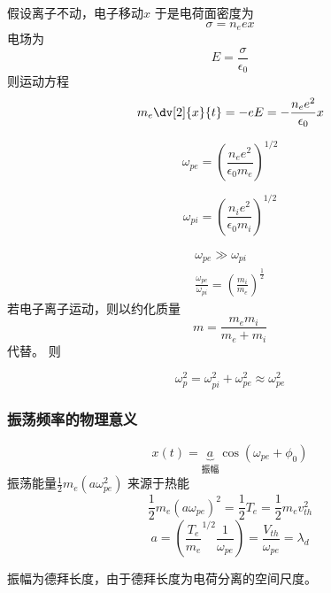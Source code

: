 假设离子不动，电子移动\(x\)
于是电荷面密度为
\begin{equation}
\sigma = n_e e x
\end{equation}
电场为
\begin{equation}
  E = \frac{\sigma}{\epsilon_0}
\end{equation}
则运动方程
\begin{equation}
  m_e \dv[2]{x}{t} = - e E = - \frac{n_e e^2}{\epsilon_0} x
\end{equation}
\begin{definition}[等离子体电子振荡频率]
  \begin{equation}
  \omega_{pe} = \left( \frac{n_e e^2}{\epsilon_0 m_e} \right)^{1 / 2}
  \end{equation}
\end{definition}
\begin{definition}[等离子体离子振荡频率]
  \begin{equation}
  \omega_{pi} = \left( \frac{n_i e^2}{\epsilon_0 m_i} \right)^{1 / 2}
  \end{equation}
\end{definition}
\begin{equation*}
  \begin{aligned}
    \omega_{pe} \gg 
    \omega_{pi} \\
    \frac{\omega_{pe}}{\omega_{pi}} = \left( \frac{m_i}{m_e} \right)^{\frac{1}{2}}
  \end{aligned}
\end{equation*}
若电子离子运动，则以约化质量
\begin{equation}
  m = \frac{m_e m_i}{m_e + m_i}
\end{equation}
代替。
则
\begin{definition}[等离子体频率]
  \begin{equation}
  \omega_p^2 =  
  \omega_{pi}^2  +
  \omega_{pe}^2 
  \approx 
  \omega_{pe}^2 
  \end{equation}
\end{definition}

\subsubsection{振荡频率的物理意义} 
\begin{equation}
  x(t) = \underbrace{a}_{\text{振幅}} \cos(\omega_{pe} + \phi_0)
\end{equation}
振荡能量\(\frac{1}{2} m_e ( a \omega_{pe}^2 )\) 来源于热能
\begin{equation}
  \frac{1}{2} m_e (a \omega_{pe})^2 = \frac{1}{2} T_e = \frac{1}{2} m_e v_{th}^2
\end{equation}
\begin{equation}
  a = ( \frac{T_e}{m_e}^{1 / 2} \frac{1}{\omega_{pe}} ) = \frac{ V_{th} }{ \omega_{pe} } = \lambda_d
\end{equation}
\begin{remark}
  振幅为德拜长度，由于德拜长度为电荷分离的空间尺度。
\end{remark}




